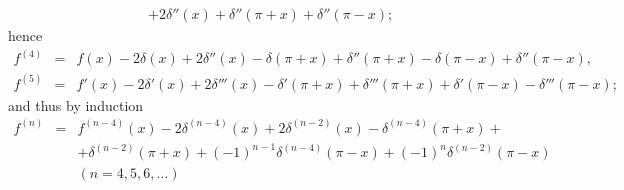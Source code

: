 {\begin{enumerate}
\begin{eqnarray*}
           &    &+2\delta''(x)+\delta''(\pi+x)+\delta''(\pi-x);
\end{eqnarray*}
hence
\begin{eqnarray*}
   f^{(4)}   &=   &f(x)-2\delta(x)+2\delta''(x)-
             \delta(\pi+x)+\delta''(\pi+x)-\delta(\pi-x)+\delta''(\pi-x), \\
   f^{(5)}   &=   &f'(x)-2\delta'(x)+2\delta'''(x)-
             \delta'(\pi + x)+\delta'''(\pi + x)+\delta'(\pi - x)-
             \delta'''(\pi - x);
\end{eqnarray*}
and thus  by induction
\begin{eqnarray*}
 f^{(n)}&=&f^{(n-4)}(x)-2\delta^{(n-4)}(x)+
             2\delta^{(n-2)}(x)-\delta^{(n-4)}(\pi+x)+\\
   &&+\delta^{(n-2)}(\pi+x)+(-1)^{n-1}
             \delta^{(n-4)}(\pi-x)+(-1)^n\delta^{(n-2)}(\pi-x)\\
   &&(n=4,5,6,\dots)
\end{eqnarray*}



\end{enumerate}

\eexample
}


\begin{center}
{\color{olive}   \Huge
\floweroneleft
}
\end{center}


